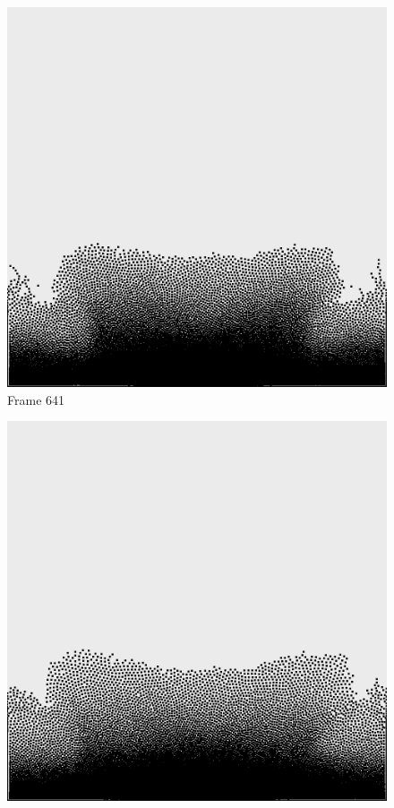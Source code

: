 \documentclass[a4paper, 12pt, oneside]{book}
\begin{document}
\begin{figure}[!ht]
    \addvspace{0.5ex}
        \begin{center}
            \includegraphics[width=\linewidth]{images/test_case_1/641.png}
            Frame 641
        \end{center}
    \endminipage
    \hfill
        \begin{center}
            \includegraphics[width=\linewidth]{images/test_case_1/661.png}

\end{center}
\end{figure}
\end{document}
